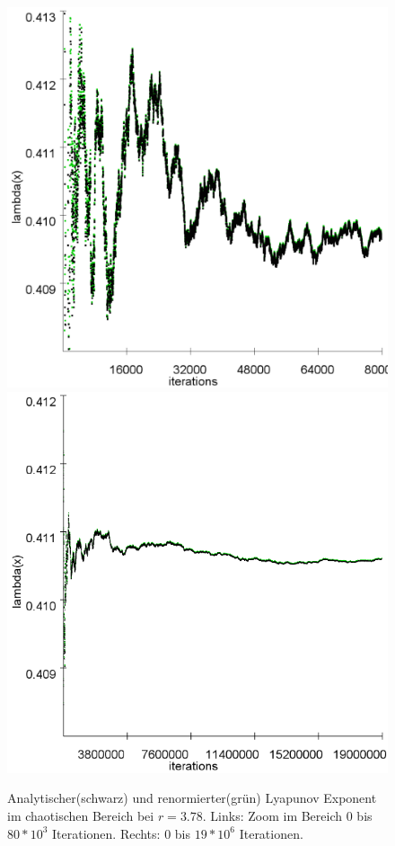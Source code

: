 \documentclass{scrartcl}
\begin{document}
\begin{figure}[!htbp]
\centering
\includegraphics[scale=0.18]{lya378-zoom}
\includegraphics[scale=0.36]{lya378}
\caption{Analytischer(schwarz) und renormierter(grün) Lyapunov Exponent im chaotischen Bereich bei $r=3.78$. Links: Zoom im Bereich 0 bis $80*10^3$ Iterationen. Rechts:  0 bis $19*10^6$ Iterationen.}
\label{fig:lyapunov-chaos}
\end{figure}
\end{document}
